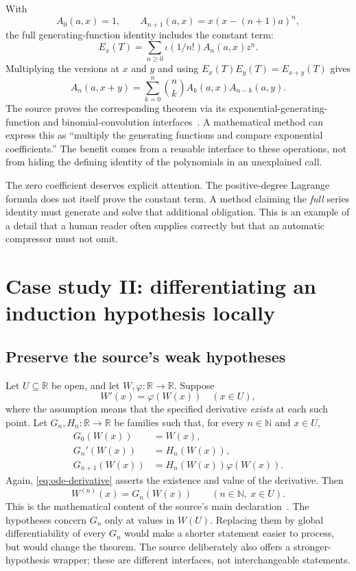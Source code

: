 \documentclass[11pt,a4paper]{article}
\newcommand{\N}{\mathbb N}
\newcommand{\R}{\mathbb R}
\theoremstyle{remark}
\begin{document}
With
\[
A_0(a,x)=1,\qquad A_{n+1}(a,x)=x(x-(n+1)a)^n,
\]
the full generating-function identity includes the constant term:
\[
E_x(T)=\sum_{n\ge0}\iota(1/n!)A_n(a,x)z^n.
\]
Multiplying the versions at $x$ and $y$ and using $E_x(T)E_y(T)=E_{x+y}(T)$ gives
\[
A_n(a,x+y)=\sum_{k=0}^n\binom nk A_k(a,x)A_{n-k}(a,y).
\]
The source proves the corresponding theorem via its exponential-generating-function and binomial-convolution interfaces~\cite{proveit-abel}. A mathematical method can express this as ``multiply the generating functions and compare exponential coefficients.'' The benefit comes from a reusable interface to these operations, not from hiding the defining identity of the polynomials in an unexplained call.

The zero coefficient deserves explicit attention. The positive-degree Lagrange formula does not itself prove the constant term. A method claiming the \emph{full} series identity must generate and solve that additional obligation. This is an example of a detail that a human reader often supplies correctly but that an automatic compressor must not omit.

\section{Case study II: differentiating an induction hypothesis locally}
\label{sec:derivatives}

\subsection{Preserve the source's weak hypotheses}

Let $U\subseteq\R$ be open, and let $W,\varphi:\R\to\R$. Suppose
\[
W'(x)=\varphi(W(x))\quad(x\in U),
\]
where the assumption means that the specified derivative \emph{exists} at each such point. Let $G_n,H_n:\R\to\R$ be families such that, for every $n\in\N$ and $x\in U$,
\begin{align}
G_0(W(x))&=W(x),\label{eq:ode-base}\\
G_n'(W(x))&=H_n(W(x)),\label{eq:ode-derivative}\\
G_{n+1}(W(x))&=H_n(W(x))\varphi(W(x)).\label{eq:ode-recurrence}
\end{align}
Again, \eqref{eq:ode-derivative} asserts the existence and value of the derivative. Then
\begin{equation}
W^{(n)}(x)=G_n(W(x))\qquad(n\in\N,\ x\in U).
\label{eq:ode-target}
\end{equation}
This is the mathematical content of the source's main  declaration~\cite{proveit-deriv}. The hypotheses concern $G_n$ only at values in $W(U)$. Replacing them by global differentiability of every $G_n$ would make a shorter statement easier to process, but would change the theorem. The source deliberately also offers a stronger-hypothesis wrapper; these are different interfaces, not interchangeable statements.
\end{document}
